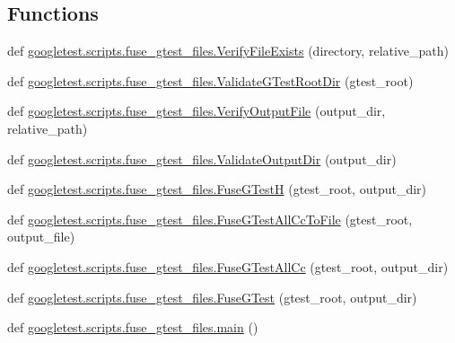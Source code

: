 \subsection*{Functions}
\begin{DoxyCompactItemize}
\item 
def \mbox{\hyperlink{namespacegoogletest_1_1scripts_1_1fuse__gtest__files_a48abd4ea8ab1c7c748ee060a05b6c51b}{googletest.\+scripts.\+fuse\+\_\+gtest\+\_\+files.\+Verify\+File\+Exists}} (directory, relative\+\_\+path)
\item 
def \mbox{\hyperlink{namespacegoogletest_1_1scripts_1_1fuse__gtest__files_a704ebbb6aeb3f0331bbd72d609752806}{googletest.\+scripts.\+fuse\+\_\+gtest\+\_\+files.\+Validate\+G\+Test\+Root\+Dir}} (gtest\+\_\+root)
\item 
def \mbox{\hyperlink{namespacegoogletest_1_1scripts_1_1fuse__gtest__files_ac65d4b5ec0f4ee8963255a8a21811037}{googletest.\+scripts.\+fuse\+\_\+gtest\+\_\+files.\+Verify\+Output\+File}} (output\+\_\+dir, relative\+\_\+path)
\item 
def \mbox{\hyperlink{namespacegoogletest_1_1scripts_1_1fuse__gtest__files_a5baad855b593c364235ad8045a3d8685}{googletest.\+scripts.\+fuse\+\_\+gtest\+\_\+files.\+Validate\+Output\+Dir}} (output\+\_\+dir)
\item 
def \mbox{\hyperlink{namespacegoogletest_1_1scripts_1_1fuse__gtest__files_aa5cbce61df344569a4b8c9804e978c00}{googletest.\+scripts.\+fuse\+\_\+gtest\+\_\+files.\+Fuse\+G\+TestH}} (gtest\+\_\+root, output\+\_\+dir)
\item 
def \mbox{\hyperlink{namespacegoogletest_1_1scripts_1_1fuse__gtest__files_a1caf7d012f1994baf00029a05a2efa1a}{googletest.\+scripts.\+fuse\+\_\+gtest\+\_\+files.\+Fuse\+G\+Test\+All\+Cc\+To\+File}} (gtest\+\_\+root, output\+\_\+file)
\item 
def \mbox{\hyperlink{namespacegoogletest_1_1scripts_1_1fuse__gtest__files_a590159622a53c7aa8705f8d6ece092d8}{googletest.\+scripts.\+fuse\+\_\+gtest\+\_\+files.\+Fuse\+G\+Test\+All\+Cc}} (gtest\+\_\+root, output\+\_\+dir)
\item 
def \mbox{\hyperlink{namespacegoogletest_1_1scripts_1_1fuse__gtest__files_a7c82d144dcaf4bcdd594f7f37cfaf03c}{googletest.\+scripts.\+fuse\+\_\+gtest\+\_\+files.\+Fuse\+G\+Test}} (gtest\+\_\+root, output\+\_\+dir)
\item 
def \mbox{\hyperlink{namespacegoogletest_1_1scripts_1_1fuse__gtest__files_ade0ad805b2d0c8003c2edd2951af846f}{googletest.\+scripts.\+fuse\+\_\+gtest\+\_\+files.\+main}} ()
\end{DoxyCompactItemize}
